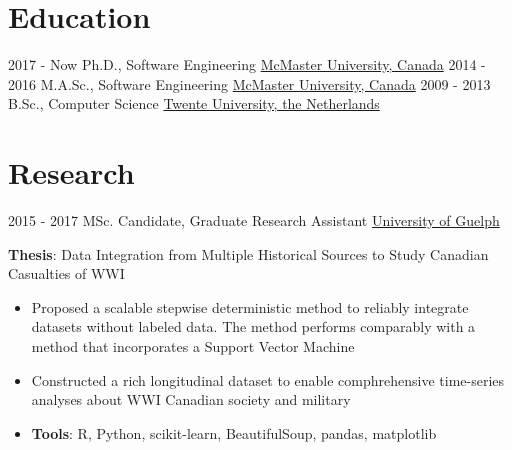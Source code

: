 \documentclass[letterpaper]{twentysecondcv} %
\begin{document}
\makeprofile %

\section{Education}

\begin{twenty} %
  \twentyitem
    {2017 - Now}
    {}
    {Ph.D., Software Engineering}%
    {\href{https://www.mcmaster.ca/}{McMaster University, Canada}}
    {}
    {}
  \twentyitem
    {2014 - 2016}
    {}
    {M.A.Sc., Software Engineering}%
    {\href{https://www.mcmaster.ca/}{McMaster University, Canada}}
    {}
    {}
  \twentyitem
    {2009 - 2013}
    {}
    {B.Sc., Computer Science}%
    {\href{https://www.utwente.nl/}{Twente University, the Netherlands}}
    {}
    {}
\end{twenty}

\section{Research}
\begin{twenty}
	\twentyitem
    	{2015 - 2017}
		{}
        {MSc. Candidate, Graduate Research Assistant}
        {\href{http://www.uoguelph.ca/}{University of Guelph}}
        {}
        {
       	\textbf{Thesis}: Data Integration from Multiple Historical Sources to Study Canadian Casualties of WWI
        {\begin{itemize}
        \item Proposed a scalable stepwise deterministic method to reliably integrate datasets without labeled data. The method performs comparably with a method that incorporates a Support Vector Machine
        \item Constructed a rich longitudinal dataset to enable comphrehensive time-series analyses about WWI Canadian society and military
        \item \textbf{Tools}: R, Python, scikit-learn, BeautifulSoup, pandas, matplotlib \vspace{2mm}
		\end{itemize}}
        }
\end{twenty}
\end{document}
